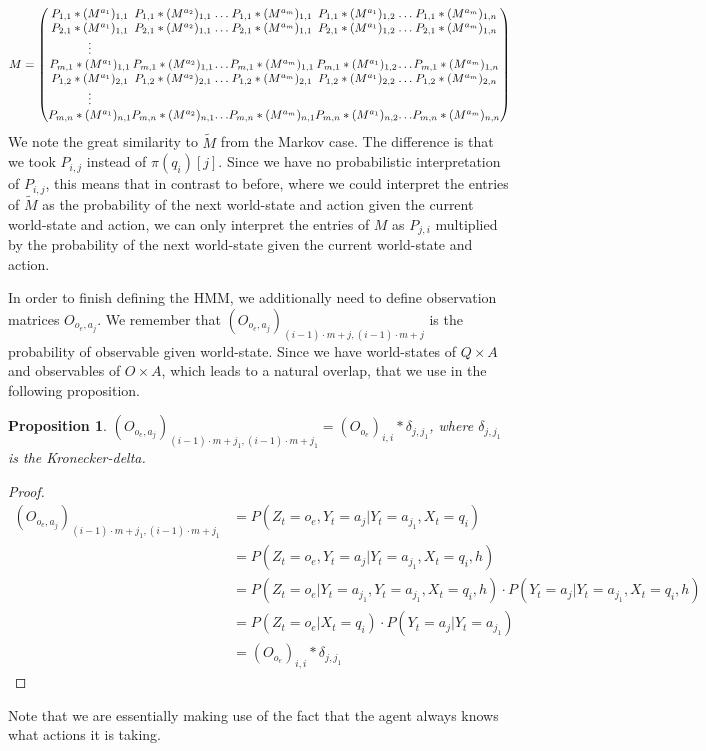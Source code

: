 \documentclass{article}
\newtheorem{prop}{Proposition}
\theoremstyle{definition}
\begin{document}
\[\setlength{\arraycolsep}{0pt} 
M=\left ( 
\begin{matrix}
P_{1,1}*(M^{a_1})_{1,1} & P_{1,1}*(M^{a_2})_{1,1} & \ldots & P_{1,1}*(M^{a_m})_{1,1} & P_{1,1}*(M^{a_1})_{1,2} & \ldots & P_{1,1}*(M^{a_m})_{1,n} \\
P_{2,1}*(M^{a_1})_{1,1} & P_{2,1}*(M^{a_2})_{1,1} & \ldots & P_{2,1}*(M^{a_m})_{1,1} & P_{2,1}*(M^{a_1})_{1,2} & \ldots &P_{2,1}*(M^{a_m})_{1,n} \\
\vdots \\
P_{m,1}*(M^{a_1})_{1,1} & P_{m,1}*(M^{a_2})_{1,1} & \ldots & P_{m,1}*(M^{a_m})_{1,1} & P_{m,1}*(M^{a_1})_{1,2} & \ldots & P_{m,1}*(M^{a_m})_{1,n} \\
P_{1,2}*(M^{a_1})_{2,1} & P_{1,2}*(M^{a_2})_{2,1} & \ldots & P_{1,2}*(M^{a_m})_{2,1} & P_{1,2}*(M^{a_1})_{2,2} & \ldots & P_{1,2}*(M^{a_m})_{2,n} \\
\vdots \\ 
P_{m,n}*(M^{a_1})_{n,1} & P_{m,n}*(M^{a_2})_{n,1} & \ldots & P_{m,n}*(M^{a_m})_{n,1} & P_{m,n}*(M^{a_1})_{n,2} & \ldots & P_{m,n}*(M^{a_m})_{n,n} \\
\end{matrix} 
\right )
\]
We note the great similarity to $\widetilde{M}$ from the Markov case. The difference is that we took $P_{i,j}$ instead of $\pi(q_i)[j]$. Since we have no probabilistic interpretation of $P_{i,j}$, this means that in contrast to before, where we could interpret the entries of $\widetilde{M}$ as the probability of the next world-state and action given the current world-state and action, we can only interpret the entries of $M$ as $P_{j,i}$ multiplied by the probability of the next world-state given the current world-state and action. 

In order to finish defining the HMM, we additionally need to define observation matrices $O_{o_e,a_j}$. We remember that $(O_{o_e,a_j})_{(i-1) \cdot m+j,(i-1) \cdot m+j}$ is the probability of observable given world-state. Since we have world-states of $Q\times A$ and observables of $O\times A$, which leads to a natural overlap, that we use in the following proposition.  
\begin{prop}
$(O_{o_e,a_j})_{(i-1) \cdot m+j_1,(i-1) \cdot m+j_1}=(O_{o_e})_{i,i}*\delta_{j,j_1}$, where $\delta_{j,j_1}$ is the Kronecker-delta.
\end{prop}
\begin{proof}
\begin{align*}
(O_{o_e,a_j})_{(i-1) \cdot m+j_1,(i-1) \cdot m+j_1}&=P(Z_t=o_e,Y_t=a_j|Y_t=a_{j_1},X_t=q_i) \\
&=P(Z_t=o_e,Y_t=a_j|Y_t=a_{j_1},X_t=q_i,h) \\
&=P(Z_t=o_e|Y_t={a_{j_1}},Y_t=a_{j_1},X_t=q_i,h)\cdot P(Y_t=a_{j}|Y_t=a_{j_1},X_t=q_i,h) \\
&=P(Z_t=o_e|X_t=q_i)\cdot P(Y_t=a_{j}|Y_t=a_{j_1}) \\
&=(O_{o_e})_{i,i}*\delta_{j,j_1}
\end{align*} 
\end{proof}
Note that we are essentially making use of the fact that the agent always knows what actions it is taking. 
\end{document}
